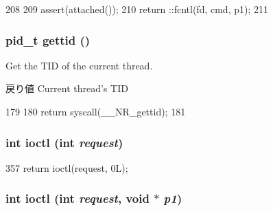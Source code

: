 \begin{DoxyCode}
208 {
209     assert(attached());
210     return ::fcntl(fd, cmd, p1);
211 }
\end{DoxyCode}
\hypertarget{classPerfKvmCounter_af0449193b7cded86e600f052d0aabd39}{
\subsubsection[{gettid}]{\setlength{\rightskip}{0pt plus 5cm}pid\_\-t gettid ()}}
\label{classPerfKvmCounter_af0449193b7cded86e600f052d0aabd39}
Get the TID of the current thread.

\begin{DoxyReturn}{戻り値}
Current thread's TID 
\end{DoxyReturn}



\begin{DoxyCode}
179 {
180     return syscall(__NR_gettid);
181 }
\end{DoxyCode}
\hypertarget{classPerfKvmCounter_af07e229bfb88ad702cdbc617b3b46578}{
\subsubsection[{ioctl}]{\setlength{\rightskip}{0pt plus 5cm}int ioctl (int {\em request})}}
\label{classPerfKvmCounter_af07e229bfb88ad702cdbc617b3b46578}



\begin{DoxyCode}
357 { return ioctl(request, 0L); }
\end{DoxyCode}
\hypertarget{classPerfKvmCounter_aa59d1d5b429119949c0a1e386cb760e4}{
\subsubsection[{ioctl}]{\setlength{\rightskip}{0pt plus 5cm}int ioctl (int {\em request}, \/  void $\ast$ {\em p1})}}
\label{classPerfKvmCounter_aa59d1d5b429119949c0a1e386cb760e4}



